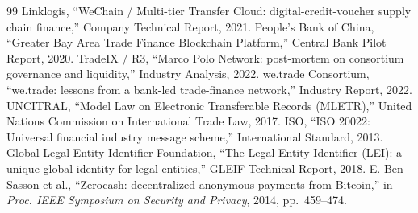 \documentclass[10pt,twocolumn,letterpaper]{article}
\begin{document}
\begin{thebibliography}{99}
 Linklogis, ``WeChain / Multi-tier Transfer Cloud: digital-credit-voucher supply chain finance,'' Company Technical Report, 2021.
 People's Bank of China, ``Greater Bay Area Trade Finance Blockchain Platform,'' Central Bank Pilot Report, 2020.
 TradeIX / R3, ``Marco Polo Network: post-mortem on consortium governance and liquidity,'' Industry Analysis, 2022.
 we.trade Consortium, ``we.trade: lessons from a bank-led trade-finance network,'' Industry Report, 2022.
 UNCITRAL, ``Model Law on Electronic Transferable Records (MLETR),'' United Nations Commission on International Trade Law, 2017.
 ISO, ``ISO 20022: Universal financial industry message scheme,'' International Standard, 2013.
 Global Legal Entity Identifier Foundation, ``The Legal Entity Identifier (LEI): a unique global identity for legal entities,'' GLEIF Technical Report, 2018.
 E. Ben-Sasson et al., ``Zerocash: decentralized anonymous payments from Bitcoin,'' in \textit{Proc. IEEE Symposium on Security and Privacy}, 2014, pp.~459--474.
\end{thebibliography}
\end{document}
